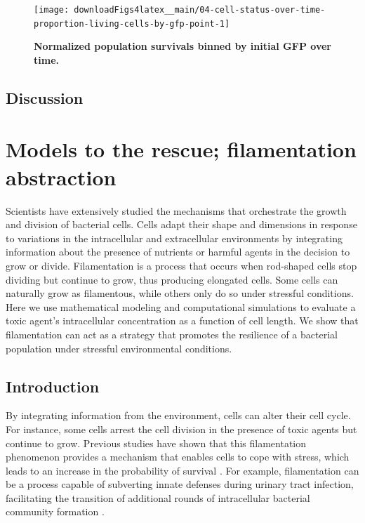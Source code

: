 \documentclass[a4paper, nobind]{templates/ociamthesis}
\begin{document}
\begin{figure}[H]
\texttt{[image: downloadFigs4latex\_\_main/04-cell-status-over-time-proportion-living-cells-by-gfp-point-1]} \caption[Normalized population survivals binned by initial GFP over time.]{\textbf{Normalized population survivals binned by initial GFP over time.}}\label{fig:04-cell-status-over-time-proportion-living-cells-by-gfp-point-1}
\end{figure}

\hypertarget{discussion}{%
\section{Discussion}\label{discussion}}

\hypertarget{filamentation-abstraction}{%
\chapter{Models to the rescue; filamentation abstraction}\label{filamentation-abstraction}}

\minitoc 

\noindent Scientists have extensively studied the mechanisms that orchestrate the growth and division of bacterial cells. Cells adapt their shape and dimensions in response to variations in the intracellular and extracellular environments by integrating information about the presence of nutrients or harmful agents in the decision to grow or divide. Filamentation is a process that occurs when rod-shaped cells stop dividing but continue to grow, thus producing elongated cells. Some cells can naturally grow as filamentous, while others only do so under stressful conditions. Here we use mathematical modeling and computational simulations to evaluate a toxic agent's intracellular concentration as a function of cell length. We show that filamentation can act as a strategy that promotes the resilience of a bacterial population under stressful environmental conditions.

\hypertarget{introduction-2}{%
\section{Introduction}\label{introduction-2}}

By integrating information from the environment, cells can alter their cell cycle. For instance, some cells arrest the cell division in the presence of toxic agents but continue to grow. Previous studies have shown that this filamentation phenomenon provides a mechanism that enables cells to cope with stress, which leads to an increase in the probability of survival \autocite{justiceMorphologicalPlasticityBacterial2008}. For example, filamentation can be a process capable of subverting innate defenses during urinary tract infection, facilitating the transition of additional rounds of intracellular bacterial community formation \autocite{justiceFilamentationEscherichiaColi2006}.
\end{document}
